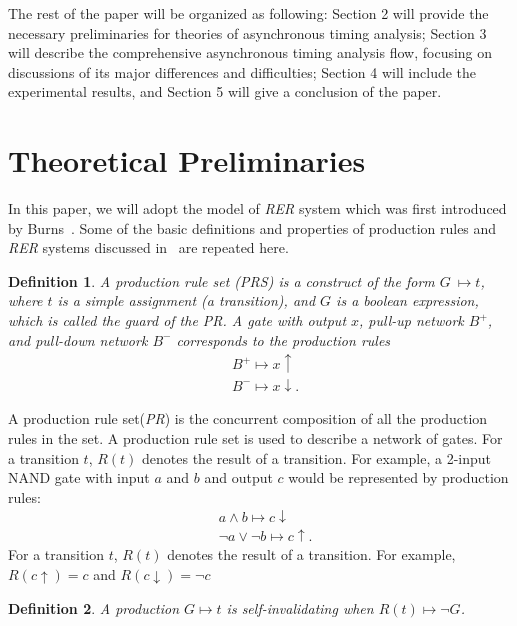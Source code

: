 \documentclass[sigconf, 10pt, twocolumn]{acmart}
\newtheorem{mydef}{Definition}
\begin{document}
The rest of the paper will be organized as following: Section 2 will provide the necessary preliminaries for theories of asynchronous timing analysis; Section 3 will describe the comprehensive asynchronous timing analysis flow, focusing on discussions of its major differences and difficulties; Section 4 will include the experimental results, and Section 5 will give a conclusion of the paper.
\section{Theoretical Preliminaries}
In this paper, we will adopt the model of {\it RER\/} system which was first introduced by Burns~\cite{Burns:Peformance}. Some of the basic definitions and properties of production rules and {\it RER\/} systems discussed in~\cite{Manohar:Quasi,Burns:Peformance,Hulgaard:Report,Hua:Exact} are repeated here.
\begin{mydef}
A production rule set ({\it PRS\/}) is a construct of the form $G \ \stackrel{}{\mapsto} t$, where $t$ is a simple assignment (a transition), and $G$ is a boolean expression, which is called the guard of the {\it PR\/}. A gate with output $x$, pull-up network $B^{+}$, and pull-down network $B^{-}$ corresponds to the production rules
\begin{align}
&B^{+} \stackrel{}{\mapsto} x\uparrow \\ \nonumber
&B^{-} \stackrel{}{\mapsto} x\downarrow.
\end{align}
\end{mydef}
A production rule set({\it PR\/}) is the concurrent composition of all the production rules in the set. A production rule set is used to describe a network of gates. For a transition $t$, $R(t)$ denotes the result of a transition. For example, a 2-input NAND gate with input $a$ and $b$ and output $c$ would be represented by production rules:
\begin{align}
&a \wedge b \stackrel{}{\mapsto} c\downarrow \\ \nonumber
&\neg a \vee \neg b \stackrel{}{\mapsto} c\uparrow.
\end{align}
  For a transition $t$, $R(t)$ denotes the result of a transition. For example, $R(c\uparrow) = c$ and $R(c\downarrow) = \neg c$
\begin{mydef}
A production $G \stackrel{}{\mapsto} t$ is self-invalidating when $R(t) \stackrel{}{\mapsto} \neg G$.
\end{mydef}
\end{document}

